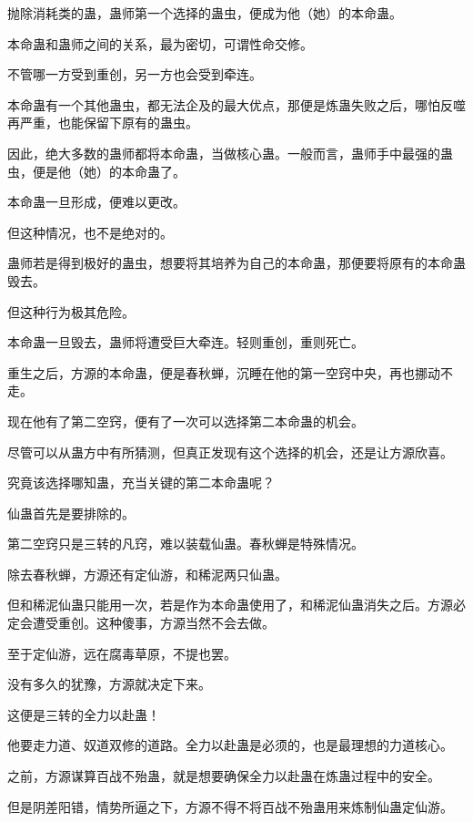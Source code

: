 
\begin{this_body}

抛除消耗类的蛊，蛊师第一个选择的蛊虫，便成为他（她）的本命蛊。

本命蛊和蛊师之间的关系，最为密切，可谓性命交修。

不管哪一方受到重创，另一方也会受到牵连。

本命蛊有一个其他蛊虫，都无法企及的最大优点，那便是炼蛊失败之后，哪怕反噬再严重，也能保留下原有的蛊虫。

因此，绝大多数的蛊师都将本命蛊，当做核心蛊。一般而言，蛊师手中最强的蛊虫，便是他（她）的本命蛊了。

本命蛊一旦形成，便难以更改。

但这种情况，也不是绝对的。

蛊师若是得到极好的蛊虫，想要将其培养为自己的本命蛊，那便要将原有的本命蛊毁去。

但这种行为极其危险。

本命蛊一旦毁去，蛊师将遭受巨大牵连。轻则重创，重则死亡。

重生之后，方源的本命蛊，便是春秋蝉，沉睡在他的第一空窍中央，再也挪动不走。

现在他有了第二空窍，便有了一次可以选择第二本命蛊的机会。

尽管可以从蛊方中有所猜测，但真正发现有这个选择的机会，还是让方源欣喜。

究竟该选择哪知蛊，充当关键的第二本命蛊呢？

仙蛊首先是要排除的。

第二空窍只是三转的凡窍，难以装载仙蛊。春秋蝉是特殊情况。

除去春秋蝉，方源还有定仙游，和稀泥两只仙蛊。

但和稀泥仙蛊只能用一次，若是作为本命蛊使用了，和稀泥仙蛊消失之后。方源必定会遭受重创。这种傻事，方源当然不会去做。

至于定仙游，远在腐毒草原，不提也罢。

没有多久的犹豫，方源就决定下来。

这便是三转的全力以赴蛊！

他要走力道、奴道双修的道路。全力以赴蛊是必须的，也是最理想的力道核心。

之前，方源谋算百战不殆蛊，就是想要确保全力以赴蛊在炼蛊过程中的安全。

但是阴差阳错，情势所逼之下，方源不得不将百战不殆蛊用来炼制仙蛊定仙游。


\end{this_body}
